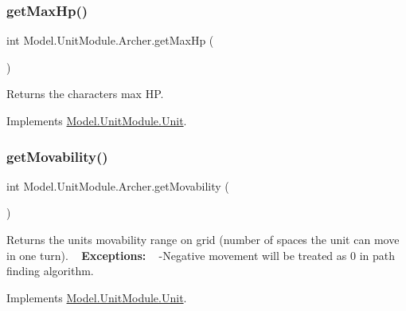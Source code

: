 \hypertarget{class_model_1_1_unit_module_1_1_archer_abbb5c6501863bea35613df66a094b490}{}\label{class_model_1_1_unit_module_1_1_archer_abbb5c6501863bea35613df66a094b490} 
\subsubsection{\texorpdfstring{get\+Max\+Hp()}{getMaxHp()}}
{\footnotesize\ttfamily int Model.\+Unit\+Module.\+Archer.\+get\+Max\+Hp (\begin{DoxyParamCaption}{ }\end{DoxyParamCaption})\hspace{0.3cm}{\ttfamily [inline]}}

Returns the character\textquotesingle{}s max HP. 

Implements \hyperlink{interface_model_1_1_unit_module_1_1_unit_adee907637c0ce8487149ae4549fb4cf1}{Model.\+Unit\+Module.\+Unit}.

\hypertarget{class_model_1_1_unit_module_1_1_archer_a54970d1557f24e41507c5bd056ac1f03}{}\label{class_model_1_1_unit_module_1_1_archer_a54970d1557f24e41507c5bd056ac1f03} 
\subsubsection{\texorpdfstring{get\+Movability()}{getMovability()}}
{\footnotesize\ttfamily int Model.\+Unit\+Module.\+Archer.\+get\+Movability (\begin{DoxyParamCaption}{ }\end{DoxyParamCaption})\hspace{0.3cm}{\ttfamily [inline]}}

Returns the unit\textquotesingle{}s movability range on grid (number of spaces the unit can move in one turn). ~\newline
{\bfseries Exceptions\+:} ~\newline
 -\/\+Negative movement will be treated as 0 in path finding algorithm. 

Implements \hyperlink{interface_model_1_1_unit_module_1_1_unit_a670aae31f46980c871774352f5fe3a3f}{Model.\+Unit\+Module.\+Unit}.

